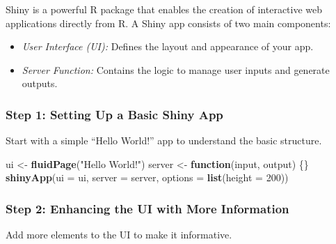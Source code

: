 \documentclass[
]{book}
\newenvironment{Shaded}{\begin{snugshade}}{\end{snugshade}}
\newcommand{\AttributeTok}[1]{\textcolor[rgb]{0.13,0.29,0.53}{#1}}
\newcommand{\ControlFlowTok}[1]{\textcolor[rgb]{0.13,0.29,0.53}{\textbf{#1}}}
\newcommand{\DecValTok}[1]{\textcolor[rgb]{0.00,0.00,0.81}{#1}}
\newcommand{\FunctionTok}[1]{\textcolor[rgb]{0.13,0.29,0.53}{\textbf{#1}}}
\newcommand{\NormalTok}[1]{#1}
\newcommand{\OtherTok}[1]{\textcolor[rgb]{0.56,0.35,0.01}{#1}}
\newcommand{\StringTok}[1]{\textcolor[rgb]{0.31,0.60,0.02}{#1}}
\begin{document}
Shiny is a powerful R package that enables the creation of interactive web applications directly from R. A Shiny app consists of two main components:

\begin{itemize}
\item
  \emph{User Interface (UI):} Defines the layout and appearance of your app.
\item
  \emph{Server Function:} Contains the logic to manage user inputs and generate outputs.
\end{itemize}

\hypertarget{step-1-setting-up-a-basic-shiny-app}{%
\subsubsection{Step 1: Setting Up a Basic Shiny App}\label{step-1-setting-up-a-basic-shiny-app}}

Start with a simple ``Hello World!'' app to understand the basic structure.

\begin{Shaded}
\begin{Highlighting}[]
\NormalTok{ui }\OtherTok{\textless{}{-}} \FunctionTok{fluidPage}\NormalTok{(}\StringTok{"Hello World!"}\NormalTok{)}
\NormalTok{server }\OtherTok{\textless{}{-}} \ControlFlowTok{function}\NormalTok{(input, output) \{\}}
\FunctionTok{shinyApp}\NormalTok{(}\AttributeTok{ui =}\NormalTok{ ui, }\AttributeTok{server =}\NormalTok{ server, }\AttributeTok{options =} \FunctionTok{list}\NormalTok{(}\AttributeTok{height =} \DecValTok{200}\NormalTok{))}
\end{Highlighting}
\end{Shaded}

\hypertarget{step-2-enhancing-the-ui-with-more-information}{%
\subsubsection{Step 2: Enhancing the UI with More Information}\label{step-2-enhancing-the-ui-with-more-information}}

Add more elements to the UI to make it informative.
\end{document}
